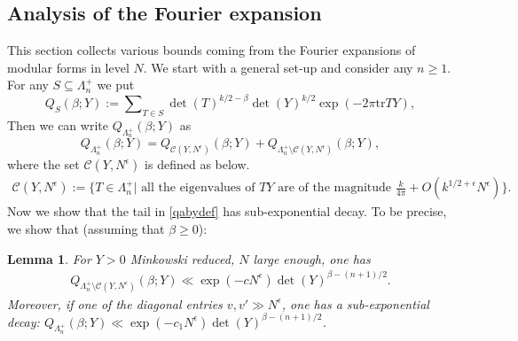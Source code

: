 \documentclass[11pt]{amsart}
\numberwithin{equation}{section}
\theoremstyle{plain}
\newtheorem{lem}[thm]{Lemma}
\theoremstyle{definition}
\newcommand{\mc}{\mathcal}
\newcommand{\tr}{\mathrm{tr}}
\newcommand{\sumn}{\sum \nolimits}
\begin{document}
\subsection{Analysis of the Fourier expansion}
This section collects various bounds coming from the Fourier expansions of modular forms in level $N$. We start with a general set-up and consider any $n  \ge 1$.
For any $S\subseteq \Lambda_n^+$ we put
\begin{equation}
    Q_S(\beta;Y) := \sumn_{T\in S} \det(T)^{k/2-\beta} \det(Y)^{k/2} \exp(-2 \pi \tr TY),
\end{equation}
%
Then we can write $Q_{\Lambda_n^+}(\beta; Y)$ as
\begin{equation}\label{qabydef}
    Q_{\Lambda_n^+}(\beta; Y)= Q_{\mc C(Y, N^\epsilon)}(\beta;Y) + Q_{\Lambda_n^+ \setminus \mc C(Y, N^\epsilon)}(\beta;Y),
\end{equation}
where the set $\mc C(Y, N^\epsilon)$ is defined as below. 
%
\begin{align}\label{cydef}
    \mc C(Y, N^\epsilon) := \{ T \in \Lambda^+_n | \text{ all the eigenvalues of } TY \text{ are of the magnitude } \frac{k}{4\pi}+O(k^{1/2+\epsilon} N^\epsilon)  \}.
\end{align}
%
Now we show that the tail in \eqref{qabydef} has sub-exponential decay. To be precise, we show that (assuming that $\beta \ge 0$):
%
\begin{lem}\label{tailest}
For $Y>0$ Minkowski reduced, $N$ large enough, one has
    \begin{align}
    Q_{\Lambda_n^+ \setminus \mc C(Y, N^\epsilon) }(\beta;Y) \ll \exp(- c N^\epsilon) \det(Y)^{\beta- (n+1)/2}.
\end{align}
Moreover, if one of the diagonal entries $v,v' \gg N^\epsilon$, one has a sub-exponential decay: $\displaystyle Q_{\Lambda_n^+}(\beta; Y) \ll \exp(-c_1 N^\epsilon) \det(Y)^{\beta- (n+1)/2}$.
\end{lem}
%
\end{document}
